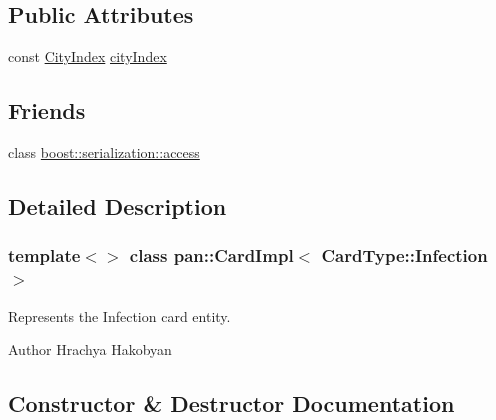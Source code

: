 \subsection*{Public Attributes}
\begin{DoxyCompactItemize}
\item 
const \hyperlink{namespacepan_afaed28aa6603153dcc062a028602d697}{City\+Index} \hyperlink{classpan_1_1_card_impl_3_01_card_type_1_1_infection_01_4_a6997050312a4c6d9e431e445862e5ed5}{city\+Index}
\end{DoxyCompactItemize}
\subsection*{Friends}
\begin{DoxyCompactItemize}
\item 
class \hyperlink{classpan_1_1_card_impl_3_01_card_type_1_1_infection_01_4_ac98d07dd8f7b70e16ccb9a01abf56b9c}{boost\+::serialization\+::access}
\end{DoxyCompactItemize}


\subsection{Detailed Description}
\subsubsection*{template$<$$>$\newline
class pan\+::\+Card\+Impl$<$ Card\+Type\+::\+Infection $>$}

Represents the Infection card entity. 

\begin{DoxyAuthor}{Author}
Hrachya Hakobyan 
\end{DoxyAuthor}


\subsection{Constructor \& Destructor Documentation}
\mbox{\label{classpan_1_1_card_impl_3_01_card_type_1_1_infection_01_4_a949201ae0814de52ad3c126a189b0f74}} 
